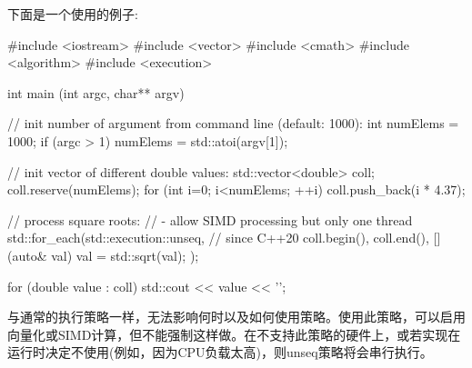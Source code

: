 下面是一个使用的例子:


\begin{cpp}
#include <iostream>
#include <vector>
#include <cmath>
#include <algorithm>
#include <execution>

int main (int argc, char** argv)
{
	// init number of argument from command line (default: 1000):
	int numElems = 1000;
	if (argc > 1) {
		numElems = std::atoi(argv[1]);
	}

	// init vector of different double values:
	std::vector<double> coll;
	coll.reserve(numElems);
	for (int i=0; i<numElems; ++i) {
		coll.push_back(i * 4.37);
	}

	// process square roots:
	// - allow SIMD processing but only one thread
	std::for_each(std::execution::unseq, // since C++20
				  coll.begin(), coll.end(),
				  [](auto& val) {
					val = std::sqrt(val);
				  });

	for (double value : coll) {
		std::cout << value << '\n';
	}
}
\end{cpp}

与通常的执行策略一样，无法影响何时以及如何使用策略。使用此策略，可以启用向量化或SIMD计算，但不能强制这样做。在不支持此策略的硬件上，或若实现在运行时决定不使用(例如，因为CPU负载太高)，则unseq策略将会串行执行。




















